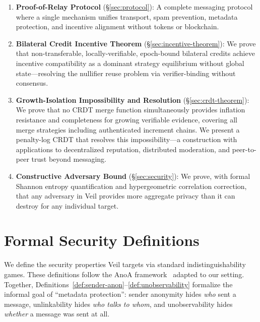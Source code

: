 \documentclass[11pt,a4paper]{article}
\begin{document}
\begin{enumerate}
    \item \textbf{Proof-of-Relay Protocol} (\S\ref{sec:protocol}): A complete messaging protocol where a single mechanism unifies transport, spam prevention, metadata protection, and incentive alignment without tokens or blockchain.

    \item \textbf{Bilateral Credit Incentive Theorem} (\S\ref{sec:incentive-theorem}): We prove that non-transferable, locally-verifiable, epoch-bound bilateral credits achieve incentive compatibility as a dominant strategy equilibrium without global state---resolving the nullifier reuse problem via verifier-binding without consensus.

    \item \textbf{Growth-Isolation Impossibility and Resolution} (\S\ref{sec:crdt-theorem}): We prove that no CRDT merge function simultaneously provides inflation resistance and completeness for growing verifiable evidence, covering all merge strategies including authenticated increment chains. We present a penalty-log CRDT that resolves this impossibility---a construction with applications to decentralized reputation, distributed moderation, and peer-to-peer trust beyond messaging.

    \item \textbf{Constructive Adversary Bound} (\S\ref{sec:security}): We prove, with formal Shannon entropy quantification and hypergeometric correlation correction, that any adversary in Veil provides more aggregate privacy than it can destroy for any individual target.
\end{enumerate}


\section{Formal Security Definitions}
\label{sec:definitions}

We define the security properties Veil targets via standard indistinguishability games. These definitions follow the AnoA framework~\cite{anoa} adapted to our setting. Together, Definitions~\ref{def:sender-anon}--\ref{def:unobservability} formalize the informal goal of ``metadata protection'': sender anonymity hides \emph{who} sent a message, unlinkability hides \emph{who talks to whom}, and unobservability hides \emph{whether} a message was sent at all.
\end{document}
